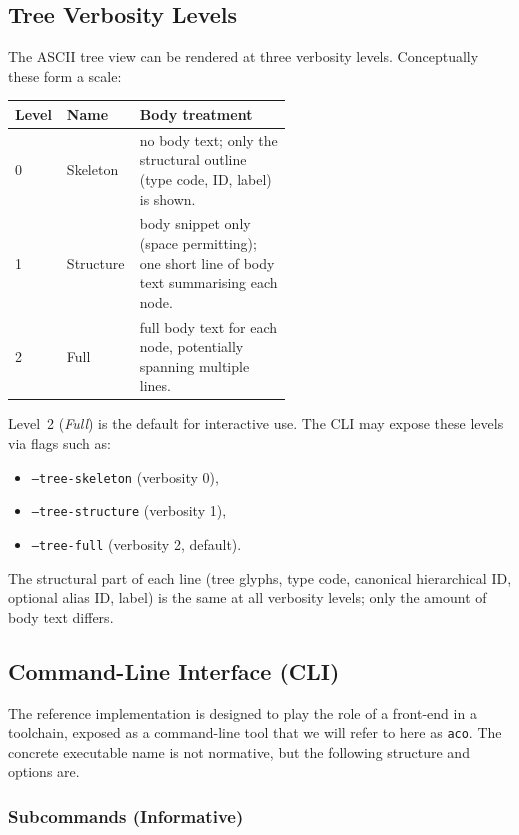 \documentclass[11pt,twoside,a4paper]{article}
\begin{document}
\subsection*{Tree Verbosity Levels}

The ASCII tree view can be rendered at three verbosity levels. Conceptually these form a scale:

\begin{center}
\begin{tabular}{llp{0.55\linewidth}}
\textbf{Level} & \textbf{Name}     & \textbf{Body treatment} \\
\hline
0 & Skeleton  & no body text; only the structural outline (type code, ID, label) is shown. \\
1 & Structure & body snippet only (space permitting); one short line of body text summarising each node. \\
2 & Full      & full body text for each node, potentially spanning multiple lines. \\
\end{tabular}
\end{center}

Level~2 (\emph{Full}) is the default for interactive use. The CLI may expose these levels via flags such as:

\begin{itemize}[leftmargin=2em]
  \item \texttt{--tree-skeleton} (verbosity 0),
  \item \texttt{--tree-structure} (verbosity 1),
  \item \texttt{--tree-full} (verbosity 2, default).
\end{itemize}

The structural part of each line (tree glyphs, type code, canonical hierarchical ID, optional alias ID, label) is the same at all verbosity levels; only the amount of body text differs.

\subsection*{Command-Line Interface (CLI)}

The reference implementation is designed to play the role of a front-end in a toolchain, exposed as a command-line tool that we will refer to here as \texttt{aco}. The concrete executable name is not normative, but the following structure and options are.

\subsubsection*{Subcommands (Informative)}
\end{document}
